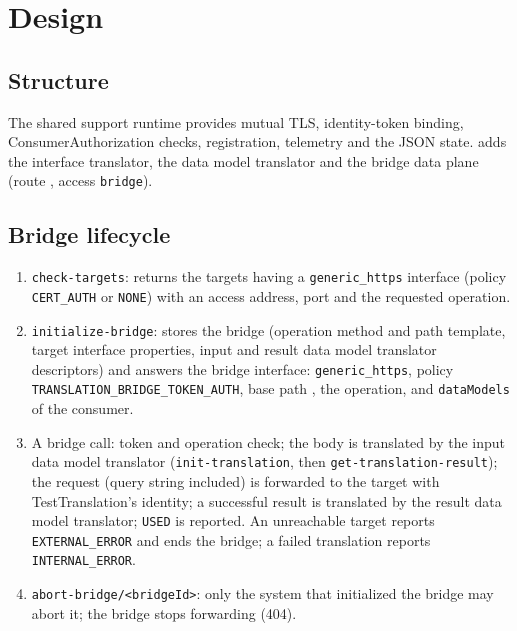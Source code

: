 \documentclass[a4paper]{arrowhead}
\begin{document}
\ArrowheadSetup
\section{Design}
\subsection{Structure}
The shared support runtime provides mutual TLS, identity-token binding, ConsumerAuthorization checks, registration, telemetry and the JSON state.  adds the interface translator, the data model translator and the bridge data plane (route , access \texttt{bridge}).
\subsection{Bridge lifecycle}
\begin{enumerate}
\item \texttt{check-targets}: returns the targets having a \texttt{generic\_https} interface (policy \texttt{CERT\_AUTH} or \texttt{NONE}) with an access address, port and the requested operation.
\item \texttt{initialize-bridge}: stores the bridge (operation method and path template, target interface properties, input and result data model translator descriptors) and answers the bridge interface: \texttt{generic\_https}, policy \texttt{TRANSLATION\_BRIDGE\_TOKEN\_AUTH}, base path , the operation, and \texttt{dataModels} of the consumer.
\item A bridge call: token and operation check; the body is translated by the input data model translator (\texttt{init-translation}, then \texttt{get-translation-result}); the request (query string included) is forwarded to the target with TestTranslation's identity; a successful result is translated by the result data model translator; \texttt{USED} is reported. An unreachable target reports \texttt{EXTERNAL\_ERROR} and ends the bridge; a failed translation reports \texttt{INTERNAL\_ERROR}.
\item \texttt{abort-bridge/<bridgeId>}: only the system that initialized the bridge may abort it; the bridge stops forwarding (404).
\end{enumerate}
\end{document}
